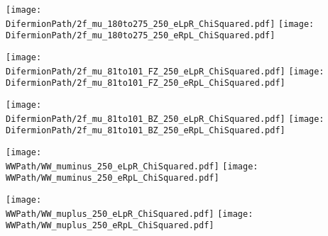 

\newcommand{\BasePath}{/home/jakob/Documents/DESY/MountPoints/DUSTMount/TGCAnalysis/SampleProduction/NewMCProduction}
\newcommand{\DifermionPath}{\BasePath/2f_Z_l/PrEWInput/validation/plots/pdf/ChiSquared}
\newcommand{\WWPath}{\BasePath/4f_WW_sl/PrEWInput/validation/plots/pdf/ChiSquared}
\newcommand{\thirdfraction}{0.32}%
\newcommand{\alonefraction}{0.7}%
\newcommand{\halffraction}{0.48}%




\begin{frame}
\begin{center}
\texttt{[image: \\DifermionPath/2f\_mu\_180to275\_250\_eLpR\_ChiSquared.pdf]}
\texttt{[image: \\DifermionPath/2f\_mu\_180to275\_250\_eRpL\_ChiSquared.pdf]}
\end{center}
\end{frame}

\begin{frame}
\begin{center}
\texttt{[image: \\DifermionPath/2f\_mu\_81to101\_FZ\_250\_eLpR\_ChiSquared.pdf]}
\texttt{[image: \\DifermionPath/2f\_mu\_81to101\_FZ\_250\_eRpL\_ChiSquared.pdf]}
\end{center}
\end{frame}

\begin{frame}
\begin{center}
\texttt{[image: \\DifermionPath/2f\_mu\_81to101\_BZ\_250\_eLpR\_ChiSquared.pdf]}
\texttt{[image: \\DifermionPath/2f\_mu\_81to101\_BZ\_250\_eRpL\_ChiSquared.pdf]}
\end{center}
\end{frame}

\begin{frame}
\begin{center}
\texttt{[image: \\WWPath/WW\_muminus\_250\_eLpR\_ChiSquared.pdf]}
\texttt{[image: \\WWPath/WW\_muminus\_250\_eRpL\_ChiSquared.pdf]}
\end{center}
\end{frame}

\begin{frame}
\begin{center}
\texttt{[image: \\WWPath/WW\_muplus\_250\_eLpR\_ChiSquared.pdf]}
\texttt{[image: \\WWPath/WW\_muplus\_250\_eRpL\_ChiSquared.pdf]}
\end{center}
\end{frame}


